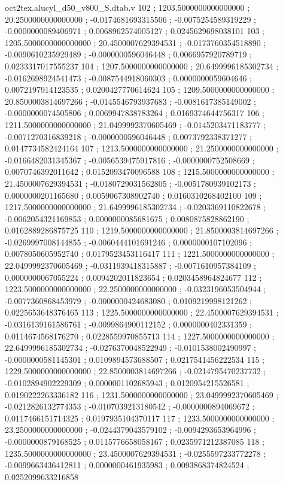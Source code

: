 \begin{filecontents}[overwrite]{oct2tex.alucyl_d50_v800_S.dtab.v}
102 ; 1203.5000000000000000 ; 20.2500000000000000 ; -0.0174681693315506 ; -0.0075254589319229 ; -0.0000000089406971 ; 0.0068962574005127 ; 0.0245629698038101
103 ; 1205.5000000000000000 ; 20.4500007629394531 ; -0.0173760354518890 ; -0.0090610235929489 ; -0.0000000596046448 ; 0.0066957920789719 ; 0.0233317017555237
104 ; 1207.5000000000000000 ; 20.6499996185302734 ; -0.0162698924541473 ; -0.0087544918060303 ; 0.0000000059604646 ; 0.0072197914123535 ; 0.0200427770614624
105 ; 1209.5000000000000000 ; 20.8500003814697266 ; -0.0145546793937683 ; -0.0081617385149002 ; -0.0000000074505806 ; 0.0069947838783264 ; 0.0169374644756317
106 ; 1211.5000000000000000 ; 21.0499992370605469 ; -0.0145203471183777 ; -0.0071270316839218 ; -0.0000000596046448 ; 0.0073792338371277 ; 0.0147734582424164
107 ; 1213.5000000000000000 ; 21.2500000000000000 ; -0.0166482031345367 ; -0.0056539475917816 ; -0.0000000752508669 ; 0.0070746392011642 ; 0.0152093470096588
108 ; 1215.5000000000000000 ; 21.4500007629394531 ; -0.0180729031562805 ; -0.0051780939102173 ; 0.0000000201165680 ; 0.0059067308902740 ; 0.0160310268402100
109 ; 1217.5000000000000000 ; 21.6499996185302734 ; -0.0203369110822678 ; -0.0062054321169853 ; 0.0000000085681675 ; 0.0080875828862190 ; 0.0162889286875725
110 ; 1219.5000000000000000 ; 21.8500003814697266 ; -0.0269997008144855 ; -0.0060444101691246 ; 0.0000000107102096 ; 0.0078050605952740 ; 0.0179523453116417
111 ; 1221.5000000000000000 ; 22.0499992370605469 ; -0.0311939418315887 ; -0.0071610957384109 ; 0.0000000067055224 ; 0.0094202011823654 ; 0.0203458964824677
112 ; 1223.5000000000000000 ; 22.2500000000000000 ; -0.0323196053504944 ; -0.0077360868453979 ; -0.0000000424683080 ; 0.0109219998121262 ; 0.0225653648376465
113 ; 1225.5000000000000000 ; 22.4500007629394531 ; -0.0316139161586761 ; -0.0099864900112152 ; 0.0000000402331359 ; 0.0114674568176270 ; 0.0228559970855713
114 ; 1227.5000000000000000 ; 22.6499996185302734 ; -0.0276370048522949 ; -0.0101538002490997 ; -0.0000000581145301 ; 0.0109894573688507 ; 0.0217541456222534
115 ; 1229.5000000000000000 ; 22.8500003814697266 ; -0.0214795470237732 ; -0.0102894902229309 ; 0.0000001102685943 ; 0.0120954215526581 ; 0.0190222263336182
116 ; 1231.5000000000000000 ; 23.0499992370605469 ; -0.0212826132774353 ; -0.0107039213180542 ; -0.0000000894069672 ; 0.0117466151714325 ; 0.0197935104370117
117 ; 1233.5000000000000000 ; 23.2500000000000000 ; -0.0244379043579102 ; -0.0094293653964996 ; -0.0000000879168525 ; 0.0115776658058167 ; 0.0235971212387085
118 ; 1235.5000000000000000 ; 23.4500007629394531 ; -0.0255597233772278 ; -0.0099663436412811 ; 0.0000000461935983 ; 0.0093868374824524 ; 0.0252099633216858

\end{filecontents}
